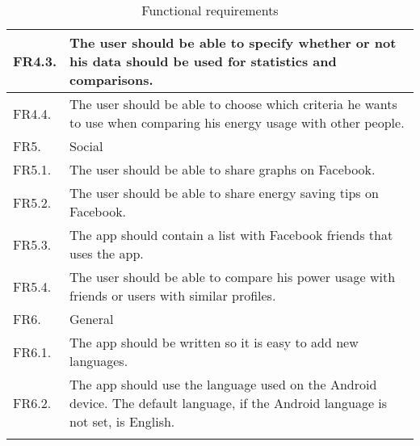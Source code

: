 \begin{longtable}{|l|p{14.5cm}|}
FR4.3. &The user should be able to specify whether or not his data should be used for statistics and comparisons.\\\hline
FR4.4. &The user should be able to choose which criteria he wants to use when comparing his energy usage with other people.\\\hline
\cellcolor{lightgray}FR5.& \cellcolor{lightgray}Social\\\hline
FR5.1. &The user should be able to share graphs on Facebook.\\\hline
FR5.2. &The user should be able to share energy saving tips on Facebook.\\\hline
FR5.3. &The app should contain a list with Facebook friends that uses the app.\\\hline
FR5.4. &The user should be able to compare his power usage with friends or users with similar profiles.\\\hline
\cellcolor{lightgray}FR6.& \cellcolor{lightgray}General\\\hline
FR6.1. &The app should be written so it is easy to add new languages.\\\hline
FR6.2. &The app should use the language used on the Android device. The default language, if the Android language is not set, is English.\\\hline
\caption{Functional requirements}
\label{tab:funcReq}
\end{longtable} 
